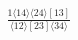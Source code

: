 \documentclass[varwidth, border=5pt]{standalone}
\begin{document}
\begin{my}
$\begin{gathered}
\scriptscriptstyle\frac{1⟨14⟩⟨24⟩[13]}{⟨12⟩[23]⟨34⟩}
\end{gathered}$
\end{my}
\end{document}
